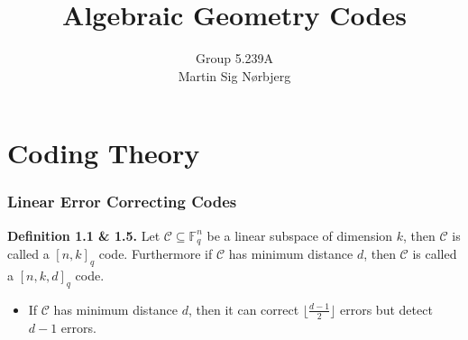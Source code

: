 \documentclass[10pt]{beamer}
\title[]%
{\Large Algebraic Geometry Codes\\
\vspace{0.3cm}}
\subtitle{}  %
\date{\no}
\author[Martin Sig Nørbjerg] %
{Group 5.239A\\
 Martin Sig Nørbjerg
}
\institute[
  Institute of Mathematics\\
  Aalborg University
] %
{%
  Institute of Mathematics\\
  Aalborg University
  
}
\begin{document}
{\aauwavesbg}
\begin{frame}
    \titlepage
\end{frame}

\section{Coding Theory}%
\label{sec:ct}

\begin{frame}
  \frametitle{Linear Error Correcting Codes}
  \textbf{Definition 1.1 \& 1.5.} Let $\mathcal{C} \subseteq \mathbb{F}_q^n$ be a linear subspace of dimension $k$, then $\mathcal{C}$ is called a $[n, k]_q$ code. Furthermore if $\mathcal{C}$ has minimum distance $d$, then $\mathcal{C}$ is called a $[n, k, d]_{q}$ code. \\
  \begin{itemize}
    \pause
    \item If $\mathcal{C}$ has minimum distance $d$, then it can correct $\lfloor\frac{d-1}{2}\rfloor$ errors but detect $d - 1$ errors.
  \end{itemize}
\end{frame}
\end{document}
